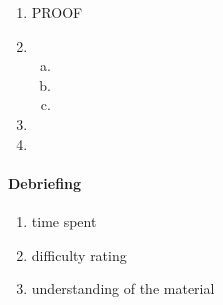 \documentclass[10pt, oneside]{article}
\begin{document}
\begin{enumerate}[1.]
	\item PROOF
	\item 
	\begin{enumerate} [(a)]
		\item
		\item 
		\item 
	\end{enumerate}
	\item 
	\item 
\end{enumerate}

\paragraph{Debriefing}
\begin{enumerate}
	\item time spent 
	\item difficulty rating
	\item understanding of the material
\end{enumerate}
\end{document}
